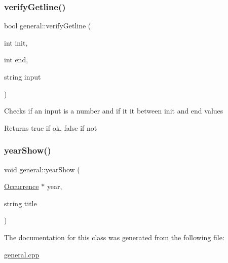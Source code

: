 \subsubsection{\texorpdfstring{verify\+Getline()}{verifyGetline()}}
{\footnotesize\ttfamily bool general\+::verify\+Getline (\begin{DoxyParamCaption}\item[{int}]{init,  }\item[{int}]{end,  }\item[{string}]{input }\end{DoxyParamCaption})}

Checks if an input is a number and if it it between init and end values \begin{DoxyReturn}{Returns}
true if ok, false if not 
\end{DoxyReturn}
\mbox{\label{classgeneral_ad7b4b452a1817239e686790feaaebb75}} 
\subsubsection{\texorpdfstring{year\+Show()}{yearShow()}}
{\footnotesize\ttfamily void general\+::year\+Show (\begin{DoxyParamCaption}\item[{\hyperlink{class_occurrence}{Occurrence} $\ast$}]{year,  }\item[{string}]{title }\end{DoxyParamCaption})}



The documentation for this class was generated from the following file\+:\begin{DoxyCompactItemize}
\item 
\hyperlink{general_8cpp}{general.\+cpp}\end{DoxyCompactItemize}
